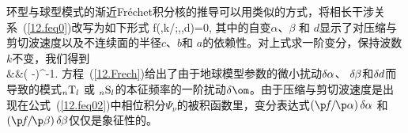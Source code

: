 环型与球型模式的渐近Fr\'{e}chet积分核的推导可以用类似的方式，将相长干涉关系~(\ref{12.feq0})改写为如下形式
\eq \label{12.feq02}
f(\om,k\hspace{-0.1 mm}/\hspace{0.1 mm}\om;\alpha,\beta,d)=0,
\en
其中的自变$\alpha$、$\beta$ 和 $d$显示了对压缩与剪切波速度以及不连续面的半径$c$、$b$和 $a$的依赖性。对上式求一阶变分，保持波数$k$不变，我们得到
\eqa \label{12.Frech}
 \nonumber \\
&&\mbox{}\times\left(
-\right)^{-1}.
\ena
方程~(\ref{12.Frech})给出了由于地球模型参数的微小扰动$\delta\hspace{-0.1 mm}\alpha$、
$\delta\hspace{-0.2 mm}\beta$和$\delta\hspace{-0.1 mm}d$而导致的模式${}_n{\rm T}_l$ 或 ${}_n{\rm S}_l$的本征频率的一阶扰动$\delta\om$。由于压缩与剪切波速度是出现在公式~(\ref{12.feq02})中相位积分$\Psi_{\nu}$的被积函数里，变分表达式$(\p\hspace{-0.3 mm}f\hspace{-0.3 mm}/\hspace{-0.3 mm}
\p\alpha)\,\delta\hspace{-0.1 mm}\alpha$
和 $(\p\hspace{-0.3 mm}f\hspace{-0.3 mm}/\hspace{-0.3 mm}
\p\beta)\,\delta\hspace{-0.2 mm}\beta$仅仅是象征性的。

